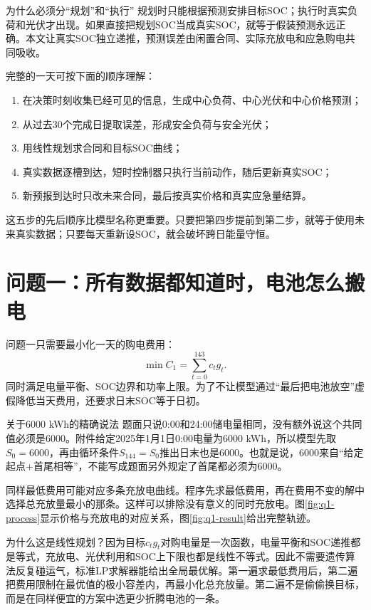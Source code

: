 \documentclass[UTF8,fontset=fandol,a4paper,11pt]{ctexart}
\begin{document}
\begin{plainbox}{为什么必须分“规划”和“执行”}
规划时只能根据预测安排目标SOC；执行时真实负荷和光伏才出现。如果直接把规划SOC当成真实SOC，就等于假装预测永远正确。本文让真实SOC独立递推，预测误差由闲置合同、实际充放电和应急购电共同吸收。
\end{plainbox}

完整的一天可按下面的顺序理解：
\begin{enumerate}[label=第\arabic*步：]
  \item 在决策时刻收集已经可见的信息，生成中心负荷、中心光伏和中心价格预测；
  \item 从过去30个完成日提取误差，形成安全负荷与安全光伏；
  \item 用线性规划求合同和目标SOC曲线；
  \item 真实数据逐槽到达，短时控制器只执行当前动作，随后更新真实SOC；
  \item 新预报到达时只改未来合同，最后按真实价格和真实应急量结算。
\end{enumerate}
这五步的先后顺序比模型名称更重要。只要把第四步提前到第二步，就等于使用未来真实数据；只要每天重新设SOC，就会破坏跨日能量守恒。

\section{问题一：所有数据都知道时，电池怎么搬电}

问题一只需要最小化一天的购电费用：
\begin{equation}
\min C_1=\sum_{t=0}^{143}c_tg_t.
\label{eq:q1objective}
\end{equation}
同时满足电量平衡、SOC边界和功率上限。为了不让模型通过“最后把电池放空”虚假降低当天费用，还要求日末SOC等于日初。

\begin{limitbox}{关于6000 kWh的精确说法}
题面只说0:00和24:00储电量相同，没有额外说这个共同值必须是6000。附件给定2025年1月1日0:00电量为6000 kWh，所以模型先取\(S_0=6000\)，再由循环条件\(S_{144}=S_0\)推出日末也是6000。也就是说，6000来自“给定起点+首尾相等”，不能写成题面另外规定了首尾都必须为6000。
\end{limitbox}

同样最低费用可能对应多条充放电曲线。程序先求最低费用，再在费用不变的解中选择总充放量最小的那条。这样可以排除没有意义的同时充放电。图\ref{fig:q1-process}显示价格与充放电的对应关系，图\ref{fig:q1-result}给出完整轨迹。

为什么这是线性规划？因为目标\(c_tg_t\)对购电量是一次函数，电量平衡和SOC递推都是等式，充放电、光伏利用和SOC上下限也都是线性不等式。因此不需要遗传算法反复碰运气，标准LP求解器能给出全局最优解。第一遍求最低费用后，第二遍把费用限制在最优值的极小容差内，再最小化总充放量。第二遍不是偷偷换目标，而是在同样便宜的方案中选更少折腾电池的一条。
\end{document}
